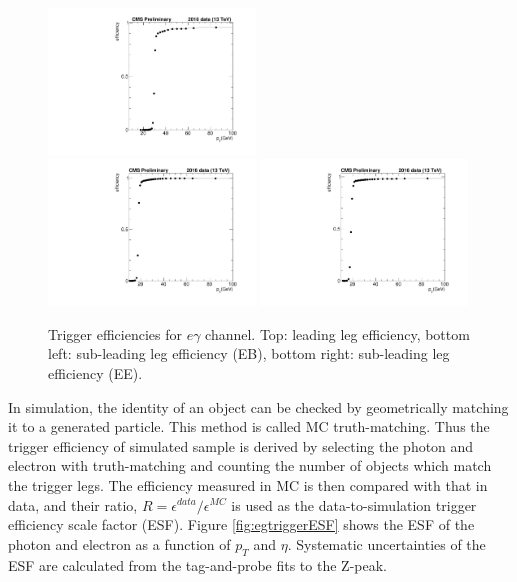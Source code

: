 \documentclass[thesis.tex]{subfiles}
\renewcommand\_{\textunderscore\allowbreak}
\begin{document}
\begin{figure}[tb]
  \centering
    \includegraphics[width=0.49\textwidth]{Figures/egTrigger_2016_leading.pdf}\\
    \includegraphics[width=0.49\textwidth]{Figures/egTrigger_2016_trailingEB.pdf}
    \includegraphics[width=0.49\textwidth]{Figures/egTrigger_2016_trailingEE.pdf}
  \caption{Trigger efficiencies for $e\gamma$ channel. Top: leading leg efficiency, bottom left: sub-leading leg efficiency (EB), bottom right: sub-leading leg efficiency (EE).}
  \label{fig:egtriggereff}
\end{figure}

In simulation, the identity of an object can be checked by geometrically matching it to a generated particle. 
This method is called MC truth-matching. 
Thus the trigger efficiency of simulated sample is derived by selecting the photon and electron with truth-matching and counting the number of objects which match the trigger legs. 
The efficiency measured in MC is then compared with that in data, and their ratio, $R = \epsilon^{data}/\epsilon^{MC}$ is used as the data-to-simulation trigger efficiency scale factor (ESF). 
Figure \ref{fig:egtriggerESF} shows the ESF of the photon and electron as a function of $p_{T}$ and $\eta$. 
Systematic uncertainties of the ESF are calculated from the tag-and-probe fits to the Z-peak. 
\end{document}
